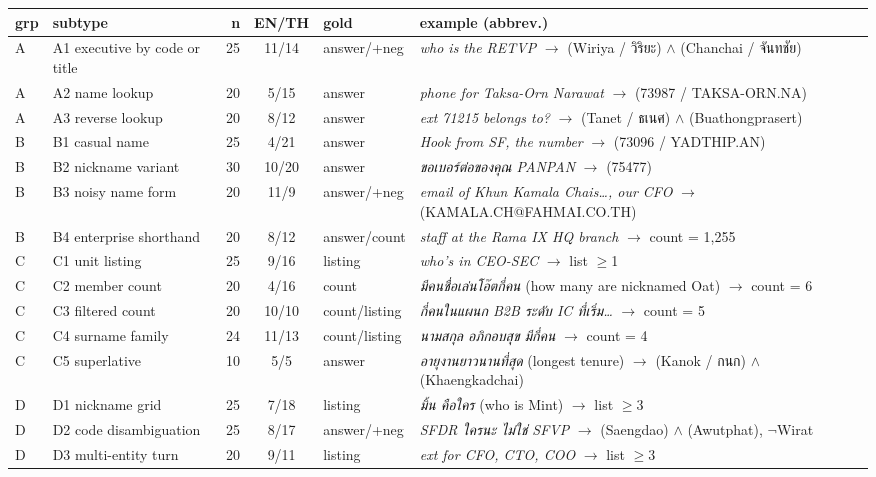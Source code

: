 \documentclass[11pt]{article}
\begin{document}
\begin{table}[t]
\centering
\footnotesize
\begin{tabular}{@{}llrcl>{\raggedright\arraybackslash}p{5.4cm}@{}}
\toprule
\textbf{grp} & \textbf{subtype} & \textbf{n} & \textbf{EN/TH} & \textbf{gold} & \textbf{example (abbrev.)} \\
\midrule
A & A1 executive by code or title & 25 & 11/14 & answer/+neg & \emph{who is the RETVP} $\to$ (Wiriya / วิริยะ) $\wedge$ (Chanchai / จันทชัย) \\
A & A2 name lookup & 20 & 5/15 & answer & \emph{phone for Taksa-Orn Narawat} $\to$ (73987 / TAKSA-ORN.NA) \\
A & A3 reverse lookup & 20 & 8/12 & answer & \emph{ext 71215 belongs to?} $\to$ (Tanet / ธเนศ) $\wedge$ (Buathongprasert) \\
B & B1 casual name & 25 & 4/21 & answer & \emph{Hook from SF, the number} $\to$ (73096 / YADTHIP.AN) \\
B & B2 nickname variant & 30 & 10/20 & answer & \emph{ขอเบอร์ต่อของคุณ PANPAN} $\to$ (75477) \\
B & B3 noisy name form & 20 & 11/9 & answer/+neg & \emph{email of Khun Kamala Chais{\ldots}, our CFO} $\to$ (KAMALA.CH@FAHMAI.CO.TH) \\
B & B4 enterprise shorthand & 20 & 8/12 & answer/count & \emph{staff at the Rama IX HQ branch} $\to$ count = 1{,}255 \\
C & C1 unit listing & 25 & 9/16 & listing & \emph{who's in CEO-SEC} $\to$ list $\ge$1 \\
C & C2 member count & 20 & 4/16 & count & \emph{มีคนชื่อเล่นโอ๊ตกี่คน} (how many are nicknamed Oat) $\to$ count = 6 \\
C & C3 filtered count & 20 & 10/10 & count/listing & \emph{กี่คนในแผนก B2B ระดับ IC ที่เริ่ม{\ldots}} $\to$ count = 5 \\
C & C4 surname family & 24 & 11/13 & count/listing & \emph{นามสกุล อภิกอบสุข มีกี่คน} $\to$ count = 4 \\
C & C5 superlative & 10 & 5/5 & answer & \emph{อายุงานยาวนานที่สุด} (longest tenure) $\to$ (Kanok / กนก) $\wedge$ (Khaengkadchai) \\
D & D1 nickname grid & 25 & 7/18 & listing & \emph{มิ้น คือใคร} (who is Mint) $\to$ list $\ge$3 \\
D & D2 code disambiguation & 25 & 8/17 & answer/+neg & \emph{SFDR ใครนะ ไม่ใช่ SFVP} $\to$ (Saengdao) $\wedge$ (Awutphat), $\neg$Wirat \\
D & D3 multi-entity turn & 20 & 9/11 & listing & \emph{ext for CFO, CTO, COO} $\to$ list $\ge$3 \\

\end{tabular}
\end{table}
\end{document}
